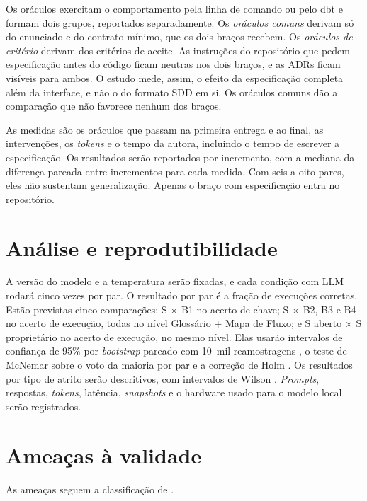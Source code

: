 Os oráculos exercitam o comportamento pela linha de comando ou pelo dbt e
formam dois grupos, reportados separadamente. Os \emph{oráculos comuns}
derivam só do enunciado e do contrato mínimo, que os dois braços recebem. Os
\emph{oráculos de critério} derivam dos critérios de aceite. As instruções do
repositório que pedem especificação antes do código ficam neutras nos dois
braços, e as ADRs ficam visíveis para ambos. O estudo mede, assim, o efeito
da especificação completa além da interface, e não o do formato SDD em si. Os
oráculos comuns dão a comparação que não favorece nenhum dos braços.

As medidas são os oráculos que passam na primeira entrega e ao final, as
intervenções, os \emph{tokens} e o tempo da autora, incluindo o tempo de
escrever a especificação. Os resultados serão reportados por incremento, com
a mediana da diferença pareada entre incrementos para cada medida. Com seis a
oito pares, eles não sustentam generalização. Apenas o braço com
especificação entra no repositório.

\section{Análise e reprodutibilidade}
\label{sec:metodologia-analise}

A versão do modelo e a temperatura serão fixadas, e cada condição com LLM
rodará cinco vezes por par. O resultado por par é a fração de execuções
corretas. Estão previstas cinco comparações: S $\times$ B1 no acerto de
chave; S $\times$ B2, B3 e B4 no acerto de execução, todas no nível
Glossário + Mapa de Fluxo; e S aberto $\times$ S proprietário no acerto de
execução, no mesmo nível. Elas usarão intervalos de confiança de 95\% por
\emph{bootstrap} pareado com 10~mil reamostragens
\cite{efron1993bootstrap}, o teste de McNemar sobre o voto da maioria por par
\cite{mcnemar1947} e a correção de Holm \cite{holm1979}. Os resultados por
tipo de atrito serão descritivos, com intervalos de Wilson \cite{wilson1927}.
\emph{Prompts}, respostas, \emph{tokens}, latência, \emph{snapshots} e o
hardware usado para o modelo local serão registrados.

\section{Ameaças à validade}
\label{sec:metodologia-ameacas-a-validade}

As ameaças seguem a classificação de .


